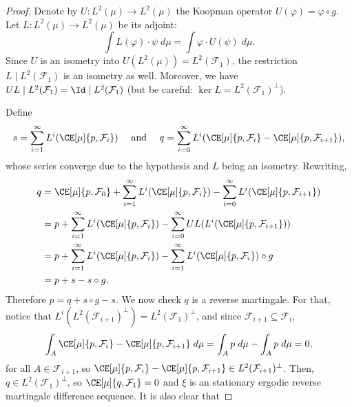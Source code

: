\documentclass[../main]{subfiles}
\begin{document}
\begin{proof}
  \newcommand{\pp}{\phi^+}
  \newcommand{\pn}{\phi^-}
  Denote by \(U \colon L^2(\mu) \to L^2(\mu)\) the Koopman operator \(U(\varphi) = \varphi \circ g\). Let \(L \colon L^2(\mu) \to L^2(\mu)\) be its adjoint:
  \begin{equation*}
    \int L(\varphi)\cdot \psi \;d\mu = \int \varphi \cdot U(\psi) \;d\mu.
  \end{equation*}
  Since \(U\) is an isometry into \(U(L^2(\mu)) = L^2(\mathcal{F}_1)\), the restriction \(L \mid L^2(\mathcal{F}_1)\) is an isometry as well. Moreover, we have \(UL\mid  L^2(\mathcal{F}_1) = \Id \mid L^2(\mathcal{F}_1)\) (but be careful: \(\ker L = L^2(\mathcal{F}_1)^{\bot}\)).

  
  Define
  \begin{equation*}
    s = \sum_{i = 1}^{\infty} L^i(\CE[\mu]{p,\mathcal{F}_i})\quad\text{ and }\quad
    q = \sum_{i = 0}^{\infty} L^i(\CE[\mu]{p,\mathcal{F}_i} - \CE[\mu]{p, \mathcal{F}_{i + 1}}),
  \end{equation*}
  whose series converge due to the hypothesis and \(L\) being an isometry. Rewriting,
  \begin{align*}
    q &=
        \CE[\mu]{p,\mathcal{F}_0} + 
        \sum_{i = 1}^{\infty} L^i(\CE[\mu]{p,\mathcal{F}_i}) - 
        \sum_{i = 0}^{\infty} L^i(\CE[\mu]{p, \mathcal{F}_{i + 1}})\\
      &=
        p +
        \sum_{i = 1}^{\infty} L^i(\CE[\mu]{p,\mathcal{F}_i}) - 
        \sum_{i = 0}^{\infty} UL(L^i(\CE[\mu]{p, \mathcal{F}_{i + 1}}))\\
      &=
        p +
        \sum_{i = 1}^{\infty} L^i(\CE[\mu]{p,\mathcal{F}_i}) - 
        \sum_{i = 1}^{\infty} L^i(\CE[\mu]{p, \mathcal{F}_{i}}) \circ g\\
      &=
        p + s - s \circ g.
  \end{align*}
  Therefore \(p = q + s \circ g - s\). We now check \(q\) is a reverse martingale. For that, notice that \(L^i(L^2(\mathcal{F}_{i + 1})^{\bot}) = L^2(\mathcal{F}_1)^{\bot}\), and since \(\mathcal{F}_{i + 1} \subseteq \mathcal{F}_i\),
  \[
    \int_A\CE[\mu]{p,\mathcal{F}_i} - \CE[\mu]{p, \mathcal{F}_{i + 1}} \;d\mu =
    \int_A p \;d\mu - \int_A p \;d\mu =
    0,
  \]
  for all \(A \in \mathcal{F}_{i + 1}\), so \(\CE[\mu]{p,\mathcal{F}_i} - \CE[\mu]{p, \mathcal{F}_{i + 1}} \in L^2(\mathcal{F}_{i + 1})^{\bot}\). Then, \(q \in L^2(\mathcal{F}_1)^{\bot}\), so \(\CE[\mu]{q,\mathcal{F}_1} = 0\) and \(\xi\) is an stationary ergodic reverse martingale difference sequence. It is also clear that

\end{proof}
\end{document}
